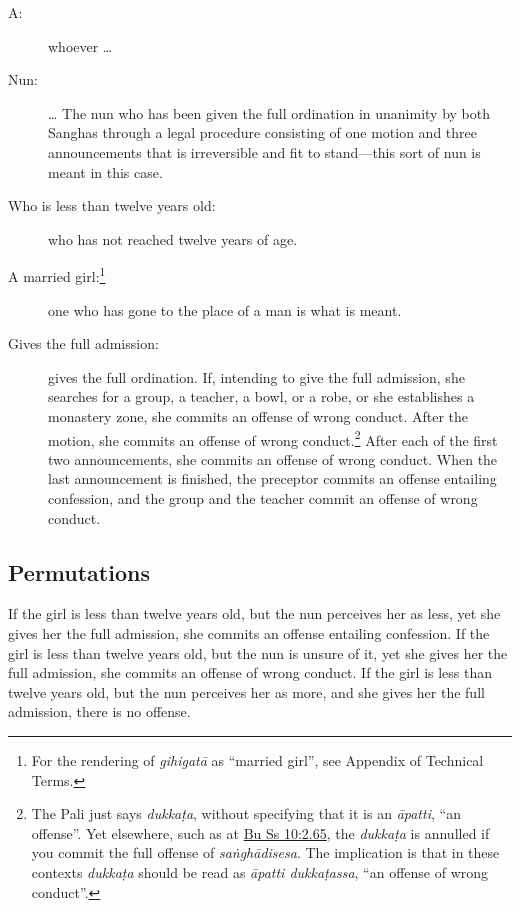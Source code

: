 \documentclass[12pt,openany]{book}%
\begin{document}
\begin{description}%
\item[A: ] whoever … %
\item[Nun: ] … The nun who has been given the full ordination in unanimity by both Sanghas through a legal procedure consisting of one motion and three announcements that is irreversible and fit to stand—this sort of nun is meant in this case. %
\item[Who is less than twelve years old: ] who has not reached twelve years of age. %
\item[A married girl:\footnote{For the rendering of \textit{\textsanskrit{gihigatā}} as “married girl”,  see Appendix of Technical Terms. } ] one who has gone to the place of a man is what is meant. %
\item[Gives the full admission: ] gives the full ordination. If, intending to give the full admission, she searches for a group, a teacher, a bowl, or a robe, or she establishes a monastery zone, she commits an offense of wrong conduct. After the motion, she commits an offense of wrong conduct.\footnote{The Pali just says \textit{\textsanskrit{dukkaṭa}}, without specifying that it is an \textit{\textsanskrit{āpatti}}, “an offense”. Yet elsewhere, such as at \href{https://suttacentral.net/pli-tv-bu-vb-ss10/en/brahmali\#2.65}{Bu Ss 10:2.65}, the \textit{\textsanskrit{dukkaṭa}} is annulled if you commit the full offense of \textit{\textsanskrit{saṅghādisesa}}. The implication is that in these contexts \textit{\textsanskrit{dukkaṭa}} should be read as \textit{\textsanskrit{āpatti} \textsanskrit{dukkaṭassa}}, “an offense of wrong conduct”. } After each of the first two announcements, she commits an offense of wrong conduct. When the last announcement is finished, the preceptor commits an offense entailing confession, and the group and the teacher commit an offense of wrong conduct. %
\end{description}

\subsection*{Permutations }

If the girl is less than twelve years old, but the nun perceives her as less, yet she gives her the full admission, she commits an offense entailing confession. If the girl is less than twelve years old, but the nun is unsure of it, yet she gives her the full admission, she commits an offense of wrong conduct. If the girl is less than twelve years old, but the nun perceives her as more, and she gives her the full admission, there is no offense. 
\end{document}
